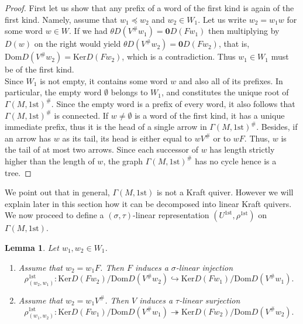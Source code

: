 \documentclass[12pt]{amsart}
\newtheorem{lemma}[theorem]{Lemma}
\theoremstyle{definition}
\newcommand{\<}{\langle}   %
\renewcommand{\>}{\rangle} %
\begin{document}
\begin{proof}
    First let us show that any prefix of a word of the first kind is again of the first kind. Namely, assume that $w_1 \preceq w_2$ and $w_2 \in W_1$. Let us write $w_2 = w_1w$ for some word $w \in W$. If we had $\theta D(V^{\#}w_1) = \mathbf 0D(Fw_1)$ then multiplying by $D(w)$ on the right would yield $\theta D(V^{\#}w_2) = \mathbf 0D(Fw_2)$, that is, $\mathrm{Dom}D(V^{\#}w_2) = \mathrm{Ker}D(Fw_2)$, which is a contradiction. Thus $w_1 \in W_1$ must be of the first kind. \\
    Since $W_1$ is not empty, it contains some word $w$ and also all of its prefixes. In particular, the empty word $\emptyset$ belongs to $W_1$, and constitutes the unique root of $\Gamma(M,1\mathrm{st})^{\#}$. Since the empty word is a prefix of every word, it also follows that $\Gamma(M,1\mathrm{st})^{\#}$ is connected. If $w \not = \emptyset$ is a word of the first kind, it has a unique immediate prefix, thus it is the head of a single arrow in $\Gamma(M,1\mathrm{st})^{\#}$. Besides, if an arrow has $w$ as its tail, its head is either equal to $wV^{\#}$ or to $wF$. Thus, $w$ is the tail of at most two arrows. Since each successor of $w$ has length strictly higher than the length of $w$, the graph $\Gamma(M,1\mathrm{st})^{\#}$ has no cycle hence is a tree.
\end{proof}

We point out that in general, $\Gamma(M,1\mathrm{st})$ is not a Kraft quiver. However we will explain later in this section how it can be decomposed into linear Kraft quivers. We now proceed to define a $(\sigma,\tau)$-linear representation $(U^{1\mathrm{st}},\rho^{1\mathrm{st}})$ on $\Gamma(M,1\mathrm{st})$. 

\begin{lemma}\label{Morphisms1stKind}
    Let $w_1, w_2 \in W_1$. 
    \begin{enumerate}
        \item Assume that $w_2 = w_1F$. Then $F$ induces a $\sigma$-linear injection
        \begin{equation*}
            \rho_{(w_2,w_1)}^{1\mathrm{st}}: \mathrm{Ker}D(Fw_2)/\mathrm{Dom} D(V^{\#}w_2) \hookrightarrow \mathrm{Ker}D(Fw_1)/\mathrm{Dom}D(V^{\#}w_1).
        \end{equation*}
        \item Assume that $w_2 = w_1V^{\#}$. Then $V$ induces a $\tau$-linear surjection
        \begin{equation*}
            \rho_{(w_1,w_2)}^{1\mathrm{st}}: \mathrm{Ker}D(Fw_1)/\mathrm{Dom} D(V^{\#}w_1) \twoheadrightarrow \mathrm{Ker}D(Fw_2)/\mathrm{Dom}D(V^{\#}w_2).
        \end{equation*}
    \end{enumerate}
\end{lemma}
\end{document}
